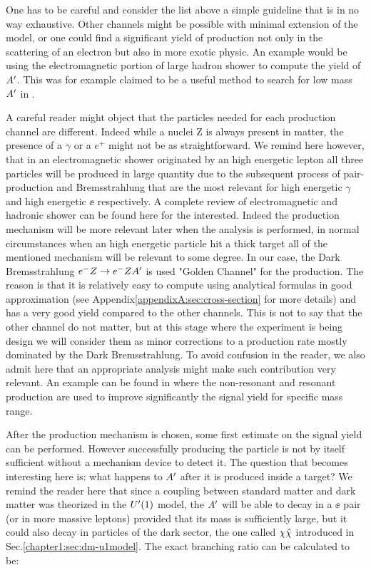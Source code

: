 One has to be careful and consider the list above a simple guideline that is in no way exhaustive. Other channels might be possible with minimal extension of the model, or one could find a significant yield of production not only in the scattering of an electron but also in more exotic physic. An example would be using the electromagnetic portion of large hadron shower to compute the yield of $A'$. This was for example claimed to be a useful method to search for low mass $A'$ in \cite{Celentano:2020vtu}.

A careful reader might object that the particles needed for each production channel are different. Indeed while a nuclei Z is always present in matter, the presence of a $\gamma$ or a $e^+$ might not be as straightforward. We remind here however, that in an electromagnetic shower originated by an high energetic lepton all three particles will be produced in large quantity due to the subsequent process of pair-production and Bremsstrahlung that are the most relevant for high energetic $\gamma$ and high energetic $\ee$ respectively. A complete review of electromagnetic and hadronic shower can be found here \cite{Bichsel:2002cf} for the interested. Indeed the production mechanism will be more relevant later when the analysis is performed, in normal circumstances when an high energetic particle hit a thick target all of the mentioned mechanism will be relevant to some degree. In our case, the Dark Bremsstrahlung $e^- Z \to e^- Z A'$ is used "Golden Channel" for the production. The reason is that it is relatively easy to compute using analytical formulas in good approximation (see Appendix\ref{appendixA:sec:cross-section} for more details) and has a very good yield compared to the other channels. This is not to say that the other channel do not matter, but at this stage where the experiment is being design we will consider them as minor corrections to a production rate mostly dominated by the Dark Bremsstrahlung. To avoid confusion in the reader, we also admit here that an appropriate analysis might make such contribution very relevant. An example can be found in \cite{Marsicano_2018} where the non-resonant and resonant production are used to improve significantly the signal yield for specific mass range.

After the production mechanism is chosen, some first estimate on the signal yield can be performed. However successfully producing the particle is not by itself sufficient without a mechanism device to detect it. The question that becomes interesting here is: what happens to $A'$ after it is produced inside a target? We remind the reader here that since a coupling between standard matter and dark matter was theorized in the $U'(1)$ model, the $A'$ will be able to decay in a $\ee$ pair (or in more massive leptons) provided that its mass is sufficiently large, but it could also decay in particles of the dark sector, the one called $\chi \hat{\chi}$ introduced in Sec.\ref{chapter1:sec:dm-u1model}. The exact branching ratio can be calculated to be:

